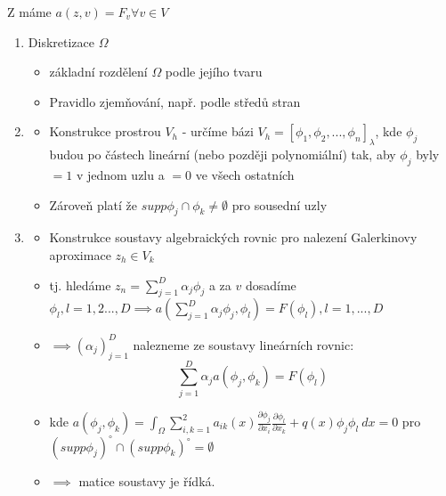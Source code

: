 \documentclass[../main.tex]{subfiles}
\begin{document}
Z  máme $a(z,v) = F_v \forall v \in V$ 


\begin{enumerate}
    \item Diskretizace $\Omega$ 
    \begin{itemize}
        \item základní rozdělení $\Omega$ podle jejího tvaru
        \item Pravidlo zjemňování, např. podle středů stran
    \end{itemize}

    \item\begin{itemize}
        \item Konstrukce prostrou $V_h$ - určíme bázi $V_h =  [\phi_1, \phi_2, ... , \phi_n ]_\lambda$, kde $\phi_j$ budou po částech lineární (nebo později polynomiální) tak, aby $\phi_j$ byly $=1$ v jednom uzlu a $=0$ ve všech ostatních
        \item Zároveň platí že $supp \phi_j \cap \phi_k \neq \emptyset$ pro sousední uzly
    \end{itemize}

    \item\begin{itemize}
        \item Konstrukce soustavy algebraických rovnic pro nalezení Galerkinovy aproximace $z_h \in V_k$
        \item tj. hledáme $z_n = \sum_{j=1}^D \alpha_j \phi_j$ a za $v$ dosadíme $\phi_l, l=1,2...,D \implies a(\sum_{j=1}^D \alpha_j \phi_j, \phi_l) = F(\phi_l), l = 1,...,D$
        \item $\implies (\alpha_j)^D_{j=1}$ nalezneme ze soustavy lineárních rovnic:
            \begin{equation}\label{soustavarovnic}
                \sum_{j=1}^D \alpha_j a(\phi_j, \phi_k) = F(\phi_l)
            \end{equation}
        \item kde $ a(\phi_j, \phi_k) = \int_\Omega \sum^2_{i,k=1} a_{ik}(x) \frac{\partial \phi_j}{\partial x_i} \frac{\partial\phi_l}{\partial x_k} + q(x) \phi_j \phi_l \ dx = 0$ pro $(supp \phi_j)^\circ \cap (supp \phi_k)^\circ = \emptyset$
        \item $\implies$ matice soustavy  je řídká. 
    \end{itemize}
\end{enumerate}
\end{document}
